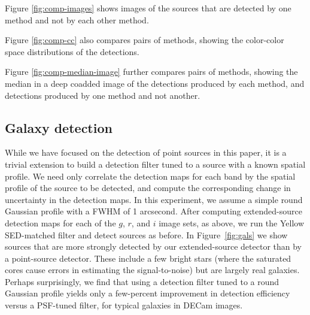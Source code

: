 \documentclass[11pt,letterpaper,linenumbers]{aastex63}
\newcommand{\figref}[1]{\mbox{Figure~\ref{#1}}}
\begin{document}
Figure \ref{fig:comp-images} shows images of the sources that are detected
by one method and not by each other method.

Figure \ref{fig:comp-cc} also compares pairs of methods, showing the
color-color space distributions of the detections.

Figure \ref{fig:comp-median-image} further compares pairs of methods, showing
the median in a deep coadded image of the detections produced by each method,
and detections produced by one method and not another.



\subsection{Galaxy detection}


While we have focused on the detection of point sources in this paper,
it is a trivial extension to build a detection filter tuned to a
source with a known spatial profile.  We need only correlate the
detection maps for each band by the spatial profile of the source to
be detected, and compute the corresponding change in uncertainty in
the detection maps.  In this experiment, we assume a simple round
Gaussian profile with a FWHM of 1 arcsecond.  After computing
extended-source detection maps for each of the $g$, $r$, and $i$ image
sets, as above, we run the Yellow SED-matched filter and detect
sources as before.  In \figref{fig:gals} we show sources that are more
strongly detected by our extended-source detector than by a
point-source detector.  These include a few bright stars (where the
saturated cores cause errors in estimating the signal-to-noise) but
are largely real galaxies.  Perhaps surprisingly, we find that using a
detection filter tuned to a round Gaussian profile yields only a
few-percent improvement in detection efficiency versus a PSF-tuned
filter, for typical galaxies in DECam images.
\end{document}
